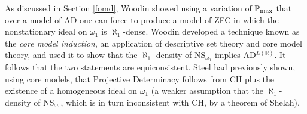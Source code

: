 \documentclass{book}%
\newcommand{\pmax}{\mathbb{P}{max}}
\begin{document}


As discussed in Section \ref{fomd}, Woodin showed using a variation of $\mathbb{P}_{\rm{max}}$ that
over a model of AD one can force to produce a model of ZFC in which the nonstationary ideal on $\omega_{1}$
is $\aleph_{1}$-dense. Woodin developed a technique known as the \emph{core
model induction}, an
application of descriptive set theory and core model theory, and used it to show that the $\aleph_{1}$-density of
NS$_{\omega_{1}}$ implies AD$^{L(\mathbb{R})}$. It follows that the two statements are equiconsistent.
Steel had previously shown, using core models, that Projective Determinacy follows from CH plus the existence
of a homogeneous ideal on $\omega_{1}$ (a weaker assumption that the $\aleph_{1}$-density of NS$_{\omega_{1}}$, which is in turn
inconsistent with CH, by a theorem of Shelah).



\end{document}
